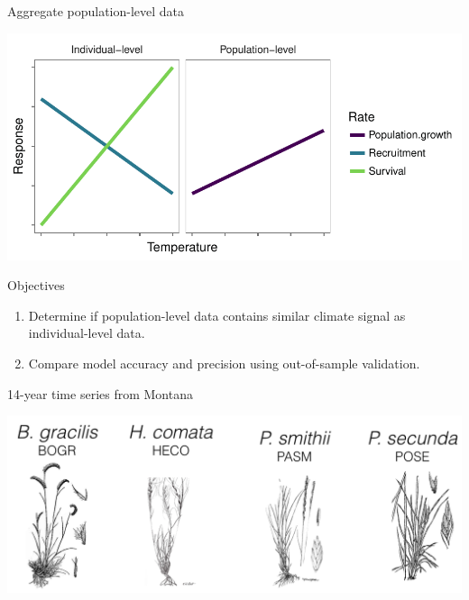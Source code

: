 \documentclass[14pt, compress, aspectratio=1610]{beamer}
\providecommand{\tightlist}{%
  \setlength{\itemsep}{0pt}\setlength{\parskip}{0pt}}
\begin{document}
\begin{frame}{%
\protect\hypertarget{aggregate-population-level-data}{%
Aggregate population-level data}}

\includegraphics[width=\textwidth]{./figures/missing_climate.pdf}

\end{frame}

\begin{frame}{%
\protect\hypertarget{objectives}{%
Objectives}}

\begin{enumerate}
[1.]
\tightlist
\item
  Determine if population-level data contains similar climate signal as
  individual-level data.
\item
  Compare model accuracy and precision using out-of-sample validation.
\end{enumerate}

\end{frame}

\begin{frame}{%
\protect\hypertarget{year-time-series-from-montana}{%
14-year time series from Montana}}

\includegraphics[width=\textwidth]{./figures/mt_spp.png}

\end{frame}
\end{document}
